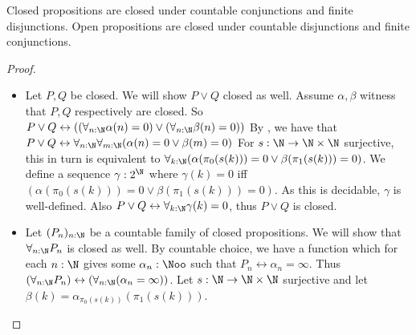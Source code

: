 \begin{lemma}\label{lemOpenClosedDisjunctionConjunction}
  Closed propositions are closed under countable conjunctions %
  and finite disjunctions.
  Open propositions are closed under countable disjunctions %
  and finite conjunctions. 
\end{lemma}
\begin{proof}
  \begin{itemize}
    \item Let $P,Q$ be closed. We will show $P\vee Q$ closed as well. 
      Assume $\alpha,\beta$ witness that $P,Q$ respectively are closed. 
      So $P\vee Q \leftrightarrow 
      ((\forall_{n:\N} \alpha(n) = 0) 
      \vee (\forall_{n:\N} \beta(n) = 0))$
      By , we have that 
      $P\vee Q \leftrightarrow 
      \forall_{n:\N}  \forall_{m:\N}  (\alpha(n) = 0 \vee \beta(m) = 0)$
      For $s:\N \to \N \times \N$ surjective, 
      this in turn is equivalent to 
      $\forall_{k:\N}  (\alpha(\pi_0(s(k))) = 0 \vee \beta(\pi_1(s(k))) = 0)$. 
      We define a sequence $\gamma:2^\N$ where 
      $\gamma(k) = 0$ iff $(\alpha(\pi_0(s(k))) = 0 \vee \beta(\pi_1(s(k))) = 0)$. 
      As this is decidable, $\gamma$ is well-defined.
      Also
      $P\vee Q \leftrightarrow \forall_{k:\N} \gamma(k) = 0$, 
      thus $P\vee Q$ is closed. 
    \item Let $(P_n)_{n:\N}$ be a countable family of closed propositions. 
      We will show that 
      $\forall_{n:\N} P_n$ is closed as well. 
      By countable choice, we have a function which for each 
      $n:\N$ gives some $\alpha_n:\Noo$ 
      such that $P_n \leftrightarrow \alpha_n =\infty$. 
      Thus $(\forall_{n:\N} P_n )\leftrightarrow 
      (\forall_{n:\N}(\alpha_n = \infty))$. 
      Let $s:\N \to \N \times \N$ surjective and let 
      $\beta(k) = \alpha_{\pi_0(s(k))}(\pi_1 (s(k)))$. 

\end{itemize}
\end{proof}
